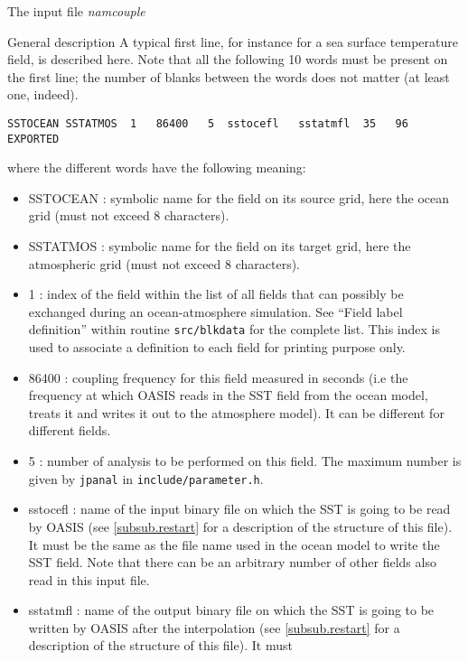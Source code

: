 \begin{subsection}{The input file {\it namcouple}}
\begin{subsubsection}{General description}
A typical first line, for instance for a sea surface temperature
field, is described here. Note that  all the following 10 words must 
be present on the first line; the number of blanks
between the words does not matter (at least one, indeed).

\begin{verbatim}
SSTOCEAN SSTATMOS  1   86400   5  sstocefl   sstatmfl  35   96  EXPORTED
\end{verbatim}
where the different words have the following meaning:
    \begin{itemize}
      \item SSTOCEAN : symbolic name for the field on its source grid,
            here the ocean grid (must not exceed 8 characters).
      \item SSTATMOS : symbolic name for the field on its target grid,
            here the atmospheric grid (must not exceed 8 characters).
      \item 1 : index of the field within the list of all fields 
            that can possibly be exchanged during an ocean-atmosphere 
            simulation. See ``Field label definition'' within
            routine {\tt src/blkdata} for the complete list. This
            index is used to associate a definition to each field for
            printing purpose only.
      \item 86400 : coupling frequency for this field
            measured in seconds (i.e the frequency at which OASIS
            reads in the SST field from the ocean model, treats it
            and writes it out to the atmosphere model). It can be
            different for different fields.
      \item 5 : number of analysis to be performed on this field.
            The maximum number is given by {\tt jpanal} in
            {\tt include/parameter.h}.  
      \item sstocefl : name of the input binary file on which the SST
            is going to be read by OASIS (see \ref{subsub.restart} for
            a description of the structure of this file). It must
            be the same as the file name used in the ocean model to write the
            SST field. Note that there can be an arbitrary number of
            other fields also read in this input file.
      \item sstatmfl : name of the output binary file on which the SST
            is going to be written by OASIS after the interpolation
            (see \ref{subsub.restart} for
            a description of the structure of this file). It must

\end{itemize}
\end{subsubsection}
\end{subsection}
